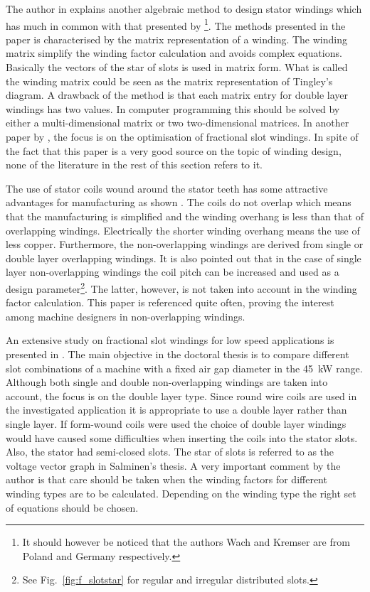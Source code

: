The author in \cite{REF-00452} explains another algebraic method to design stator windings which has much in common with that presented by \cite{REF-00266}\footnote{It should however be noticed that the authors Wach and Kremser are from Poland and Germany respectively.}.  The methods presented in the paper is characterised by the matrix representation of a winding. The winding matrix simplify the winding factor calculation and avoids complex equations. Basically the vectors of the star of slots is used in matrix form. What is called the winding matrix could be seen as the matrix representation of Tingley's diagram. A drawback of the method is that each matrix entry for double layer windings has two values. In computer programming this should be solved by either a multi-dimensional matrix or two two-dimensional matrices. In another paper by \cite{REF-00454}, the focus is on the optimisation of fractional slot windings. In spite of the fact that this paper is a very good source on the topic of winding design, none of the literature in the rest of this section refers to it.
 
The use of stator coils wound around the stator teeth has some attractive advantages for manufacturing as shown \cite{REF-00754}. The coils do not overlap which means that the manufacturing is simplified and the winding overhang is less than that of overlapping windings. Electrically the shorter winding overhang means the use of less copper. Furthermore, the non-overlapping windings are derived from single or double layer overlapping windings. It is also pointed out that in the case of single layer non-overlapping windings the coil pitch can be increased and used as a design parameter\footnote{See Fig.~\ref{fig:f_slotstar} for regular and irregular distributed slots.}. The latter, however, is not taken into account in the winding factor calculation. This paper is referenced quite often, proving the interest among machine designers in non-overlapping windings.  

An extensive study on fractional slot windings for low speed applications is presented in \cite{REF-01055}. The main objective in the doctoral thesis is to compare different slot combinations of a machine with a fixed air gap diameter in the \SI{45}{kW} range. Although both single and double non-overlapping windings are taken into account, the focus is on the double layer type. Since round wire coils are used in the investigated application it is appropriate to use a double layer rather than single layer. If form-wound coils were used the choice of double layer windings would have caused some difficulties when inserting the coils into the stator slots. Also, the stator had semi-closed slots. The star of slots is referred to as the voltage vector graph in Salminen's thesis. A very important comment by the author is that care should be taken when the winding factors for different winding types are to be calculated. Depending on the winding type the right set of equations should be chosen. 

